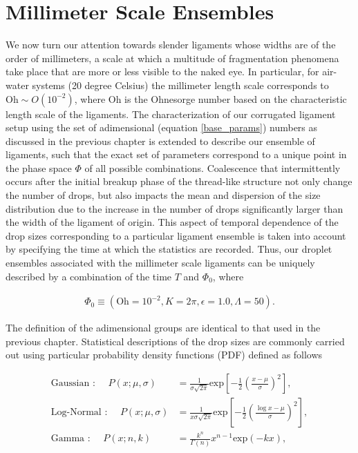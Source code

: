 \section{Millimeter Scale Ensembles}

We now turn our attention towards slender ligaments whose widths are of the 
order of millimeters, a scale at which a multitude of fragmentation phenomena
take place that are more or less visible to the naked eye.
In particular, for air-water systems (20 degree Celsius) the millimeter length 
scale corresponds to $\textrm{Oh} \sim O(10^{-2})$, where $\textrm{Oh}$ is the Ohnesorge number
based on the characteristic length scale of the ligaments. 
The characterization of our corrugated ligament setup using the set of adimensional
(equation \eqref{base_params}) numbers as discussed in the previous chapter is extended 
to describe our ensemble of ligaments, such that the exact set of parameters
correspond to a unique point in the phase space $\Phi$ of all possible combinations. 
Coalescence that intermittently occurs after the initial breakup phase of 
the thread-like structure not only change the number of drops, but also impacts the 
mean and dispersion of the size distribution due to the increase in the number of drops
significantly larger than the width of the ligament of origin.   
This aspect of temporal dependence of the drop sizes corresponding to a particular ligament ensemble
is taken into account by specifying the time at which the statistics are recorded. 
Thus, our droplet ensembles associated with the millimeter scale ligaments can be uniquely described 
by a combination of the time $T$ and $\Phi_0$, where

\begin{align}
	\Phi_0 \equiv \left( \textrm{Oh}=10^{-2}, K=2\pi, \epsilon=1.0, \Lambda=50 \right). 
\end{align}

The definition of the adimensional groups are identical to that used in the previous chapter.
Statistical descriptions of the drop sizes are commonly carried out using
particular probability density functions (PDF) defined as follows 



\begin{align}
	\text{Gaussian : } \quad P\left( x ; \mu , \sigma \right) &= 
	\frac{1}{\sigma \sqrt{2\pi}} \textrm{exp}\left[-\frac{1}{2}\left(\frac{x - \mu}{\sigma}\right)^2\right] \label{gauss},\\
	\text{Log-Normal : } \quad P\left( x ; \mu , \sigma \right) &= 
	\frac{1}{x \sigma \sqrt{2\pi}} \textrm{exp}\left[-\frac{1}{2}\left(\frac{\log x - \mu}{\sigma}\right)^2\right] \label{log_normal},\\
	\text{Gamma : } \quad P\left( x ; n,k \right) &= 
	\frac{k^{n}}{\Gamma(n)} x^{n-1} \textrm{exp}\left(-k x\right) \label{gamma}, 
\end{align}

